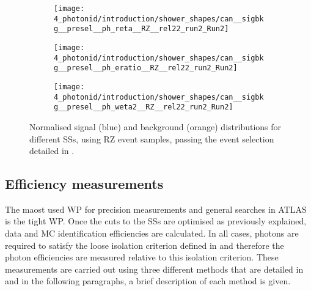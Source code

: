 \begin{figure}[ht!]
    \centering
    \begin{subfigure}[h]{0.32\linewidth}
        \centering
        \texttt{[image: 4\_photonid/introduction/shower\_shapes/can\_\_sigbkg\_\_presel\_\_ph\_reta\_\_RZ\_\_rel22\_run2\_Run2]}
        \caption{\reta}
        \label{fig:pid_ss:optimisation:shower_shapes:reta}
    \end{subfigure}
    \hfill
    \begin{subfigure}[h]{0.32\linewidth}
        \centering
        \texttt{[image: 4\_photonid/introduction/shower\_shapes/can\_\_sigbkg\_\_presel\_\_ph\_eratio\_\_RZ\_\_rel22\_run2\_Run2]}
        \caption{\eratio}
        \label{fig:pid_ss:optimisation:shower_shapes:eratio}
    \end{subfigure}
    \hfill
    \begin{subfigure}[h]{0.32\linewidth}
        \centering
        \texttt{[image: 4\_photonid/introduction/shower\_shapes/can\_\_sigbkg\_\_presel\_\_ph\_weta2\_\_RZ\_\_rel22\_run2\_Run2]}
        \caption{\weta}
        \label{fig:pid_ss:optimisation:shower_shapes:weta2}
    \end{subfigure}
    \caption{Normalised signal (blue) and background (orange) distributions for different \acp{SS}, using \ac{RZ} event samples, passing the event selection detailed in \Sect{\ref{subsec:pid_ss:pid:event_selection}}.}
    \label{fig:pid_ss:optimisation:shower_shapes}
\end{figure}



\subsection{Efficiency measurements}

The maost used \ac{WP} for precision measurements and general searches in \ac{ATLAS} is the tight \ac{WP}. Once the cuts to the \acp{SS} are optimised as previously explained, data and \ac{MC} identification efficiencies are calculated. In all cases, photons are required to satisfy the loose isolation criterion defined in \Sect{\ref{subsec:objects:egamma:iso}} and therefore the photon efficiencies are measured relative to this isolation criterion. These measurements are carried out using three different methods that are detailed in  and in the following paragraphs, a brief description of each method is given.

